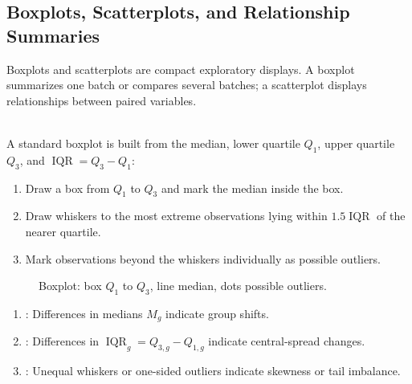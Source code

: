 \subsection{Boxplots, Scatterplots, and Relationship Summaries}

Boxplots and scatterplots are compact exploratory displays.  A boxplot summarizes one batch or compares several batches; a scatterplot displays relationships between paired variables.

\begin{method} \label{meth:boxplot-construction} \\
A standard boxplot is built from the median, lower quartile $Q_1$, upper quartile $Q_3$, and $\operatorname{IQR}=Q_3-Q_1$:
\begin{enumerate}[label=(\roman*)]
\setlength{\itemsep}{0pt}
\item Draw a box from $Q_1$ to $Q_3$ and mark the median inside the box.
\item Draw whiskers to the most extreme observations lying within $1.5\operatorname{IQR}$ of the nearer quartile.
\item Mark observations beyond the whiskers individually as possible outliers.
\end{enumerate}
\end{method}

\begin{figure}[H]
  \centering
  
  \caption{Boxplot: box $Q_1$ to $Q_3$, line median, dots possible outliers.}
  \label{fig:eda-boxplot-schematic}
\end{figure}

\begin{remark} \label{rem:boxplots-compare-batches} 
\begin{enumerate}[label=(\roman*)]
\setlength{\itemsep}{0pt}
\item {}: Differences in medians $M_g$ indicate group shifts.
\item {}: Differences in $\operatorname{IQR}_g=Q_{3,g}-Q_{1,g}$ indicate central-spread changes.
\item {}: Unequal whiskers or one-sided outliers indicate skewness or tail imbalance.
\end{enumerate}
\end{remark}

